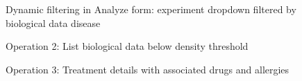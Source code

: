 \documentclass[11pt,a4paper]{article}
\begin{document}
\begin{figure}[H]
  \centering
  \caption{Dynamic filtering in Analyze form: experiment dropdown filtered by biological data disease}
  \label{fig:webapp-analyze}
\end{figure}

\begin{figure}[H]
  \centering
  \caption{Operation 2: List biological data below density threshold}
  \label{fig:webapp-op2}
\end{figure}

\begin{figure}[H]
  \centering
  \caption{Operation 3: Treatment details with associated drugs and allergies}
  \label{fig:webapp-op3}
\end{figure}
\end{document}
